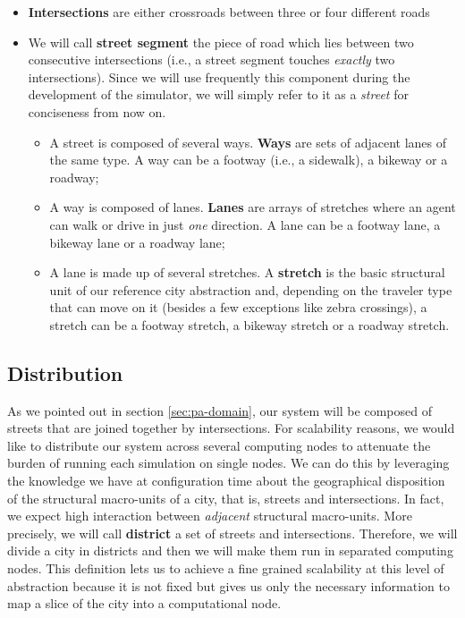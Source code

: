 \begin{itemize}
  \item \textbf{Intersections} are either crossroads between three or four
    different roads
  \item We will call \textbf{street segment} the piece of road which lies
    between two consecutive intersections (i.e., a street segment touches
    \textit{exactly} two intersections). Since we will use frequently this
    component during the development of the simulator, we will simply refer to
    it as a \textit{street} for conciseness from now on.
    \begin{itemize}
      \item A street is composed of several ways. \textbf{Ways} are sets of
        adjacent lanes of the same type. A way can be a footway (i.e., a
        sidewalk), a bikeway or a roadway;
      \item A way is composed of lanes. \textbf{Lanes} are arrays of stretches
        where an agent can walk or drive in just \textit{one} direction. A lane can be a footway lane,
        a bikeway lane or a roadway lane;
      \item A lane is made up of several stretches. A \textbf{stretch} is the
        basic structural unit of our reference city abstraction and, depending
        on the traveler type that can move on it (besides a few exceptions
        like zebra crossings), a stretch can be a footway stretch, a bikeway
        stretch or a roadway stretch.
    \end{itemize}
\end{itemize}


\subsection{Distribution}\label{sec:pa-distribution}
As we pointed out in section \ref{sec:pa-domain}, our system will be composed
of streets that are joined together by intersections.
For scalability reasons, we would like to distribute our system across several
computing nodes to attenuate the burden of running each simulation on single
nodes. We can do this by leveraging the knowledge we have at configuration time
about the geographical disposition of the structural macro-units of a city,
that is, streets and intersections. In fact, we expect high interaction between
\textit{adjacent} structural macro-units.
More precisely, we will call \textbf{district} a set of streets and
intersections. Therefore, we will divide a city in districts and then we will
make them run in separated computing nodes. This definition lets us to achieve
a fine grained scalability at this level of abstraction because it is not
fixed but gives us only the necessary information to map a slice of the city
into a computational node.

